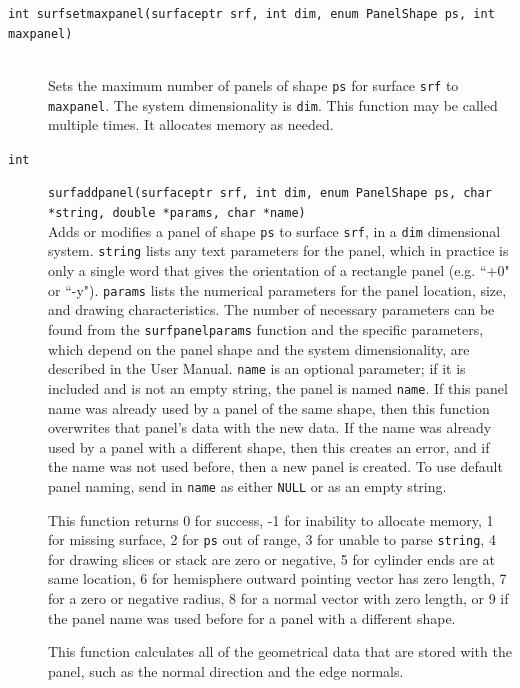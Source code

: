 \documentclass {scrbook}
\newcommand {\ttt} {\texttt}
\begin{document}
\begin{description}
\item[\ttt{int surfsetmaxpanel(surfaceptr srf, int dim, enum PanelShape ps, int maxpanel)}]
\hfill \\
Sets the maximum number of panels of shape \ttt{ps} for surface \ttt{srf} to \ttt{maxpanel}. The system dimensionality is \ttt{dim}. This function may be called multiple times. It allocates memory as needed.

\item[\ttt{int}]
\ttt{surfaddpanel(surfaceptr srf, int dim, enum PanelShape ps, char *string, double *params, char *name)}
\hfill \\
Adds or modifies a panel of shape \ttt{ps} to surface \ttt{srf}, in a \ttt{dim} dimensional system. \ttt{string} lists any text parameters for the panel, which in practice is only a single word that gives the orientation of a rectangle panel (e.g. ``+0" or ``-y"). \ttt{params} lists the numerical parameters for the panel location, size, and drawing characteristics. The number of necessary parameters can be found from the \ttt{surfpanelparams} function and the specific parameters, which depend on the panel shape and the system dimensionality, are described in the User Manual. \ttt{name} is an optional parameter; if it is included and is not an empty string, the panel is named \ttt{name}. If this panel name was already used by a panel of the same shape, then this function overwrites that panel's data with the new data. If the name was already used by a panel with a different shape, then this creates an error, and if the name was not used before, then a new panel is created. To use default panel naming, send in \ttt{name} as either \ttt{NULL} or as an empty string.

This function returns 0 for success, -1 for inability to allocate memory, 1 for missing surface, 2 for \ttt{ps} out of range, 3 for unable to parse \ttt{string}, 4 for drawing slices or stack are zero or negative, 5 for cylinder ends are at same location, 6 for hemisphere outward pointing vector has zero length, 7 for a zero or negative radius, 8 for a normal vector with zero length, or 9 if the panel name was used before for a panel with a different shape.

This function calculates all of the geometrical data that are stored with the panel, such as the normal direction and the edge normals.


\end{description}
\end{document}

